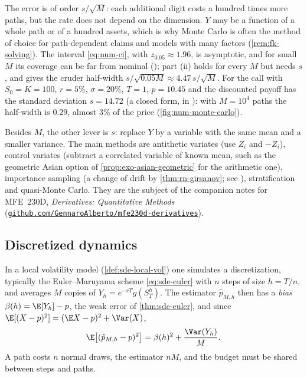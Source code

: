 The error is of order $s/\sqrt M$: each additional digit costs a hundred times more paths, but
the rate does not depend on the dimension. $Y$ may be a function of a whole path or of a hundred
assets, which is why Monte Carlo is often the method of choice for path-dependent claims and
models with many factors (\cref{rem:fk-solving}). The interval \eqref{eq:num-ci}, with $z_{0.05}\approx1.96$, is
asymptotic, and for small $M$ its coverage can be far from nominal (); part
(ii) holds for every $M$ but needs $s$, and gives the cruder half-width $s/\sqrt{0.05M}\approx4.47\,s/\sqrt M$.
For the call with $S_0=K=100$, $r=5\%$, $\sigma=20\%$, $T=1$, $p=10.45$ and the discounted payoff
has the standard deviation $s=14.72$ (a closed form, in ): with
$M=10^4$ paths the half-width is $0.29$, almost $3\%$ of the price (\cref{fig:num-monte-carlo}).

\begin{remark}\label{rem:num-variance-reduction}
Besides $M$, the other lever is $s$: replace $Y$ by a variable with the same mean and a smaller
variance. The main methods are antithetic variates (use $Z_i$ and $-Z_i$), control variates
(subtract a correlated variable of known mean, such as the geometric Asian option of
\cref{prop:exo-asian-geometric} for the arithmetic one), importance sampling (a change of drift by
\cref{thm:rn-girsanov}; see ), stratification and quasi-Monte Carlo. They are
the subject of the companion notes for MFE~230D, \emph{Derivatives: Quantitative Methods}
(\href{https://github.com/GennaroAlberto/mfe230d-derivatives}{\nolinkurl{github.com/GennaroAlberto/mfe230d-derivatives}}).
\end{remark}

\subsection{Discretized dynamics}\label{sec:num-mc-bias}

In a local volatility model (\cref{def:sde-local-vol}) one simulates a discretization, typically
the Euler--Maruyama scheme \eqref{eq:sde-euler} with $n$ steps of size $h=T/n$, and averages $M$
copies of $Y_h=e^{-rT}g(S^h_T)$. The estimator $\hat p_{M,h}$ then has a \emph{bias}
$\beta(h)=\E[Y_h]-p$, the weak error of \cref{thm:sde-euler}, and since $\E[(X-p)^2]=(\E X-p)^2+\Var(X)$,
\begin{equation}\label{eq:num-mse}
  \E\big[(\hat p_{M,h}-p)^2\big]=\beta(h)^2+\frac{\Var(Y_h)}{M}.
\end{equation}
A path costs $n$ normal draws, the estimator $nM$, and the budget must be shared between steps and
paths.

